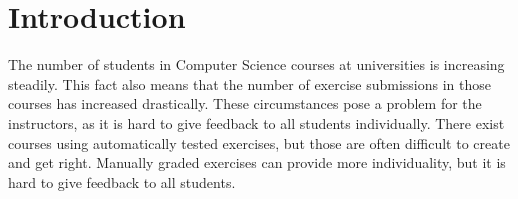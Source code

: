 
\def\proposal{Proposal for}

\usepackage[nolist]{acronym}


\setlength{\evensidemargin}{22pt}
\setlength{\oddsidemargin}{22pt}



\lstset{showspaces=false, numbers=left, frame=single, basicstyle=\small}




\fancyhead{}
\pagestyle{fancy}
\fancyhead[LE]{\slshape \leftmark}
\fancyhead[RO]{\slshape \rightmark}
\headheight=15pt

\section*{Introduction}

The number of students in Computer Science courses at universities is increasing steadily. This fact also means that the number of exercise submissions in those courses has increased drastically.
These circumstances pose a problem for the instructors, as it is hard to give feedback to all students individually. There exist courses using automatically tested exercises, but those are often difficult to create and get right. Manually graded exercises can provide more individuality, but it is hard to give feedback to all students.

